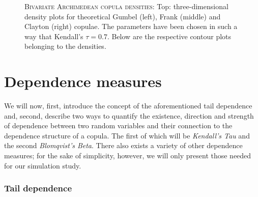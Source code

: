 \begin{figure}[!ht]
{	}
	\hfill
	\hfill
	\caption[\textsc{Bivariate Archimedean copula densities:} A comparison between Gumbel, Frank and Clayton copulae]{\textsc{Bivariate Archimedean copula densities:} Top: three-dimensional density plots for theoretical Gumbel (left), Frank (middle) and Clayton (right) copulae. The parameters have been chosen in such a way that Kendall's $\tau = 0.7$. Below are the respective contour plots belonging to the densities.}
	\label{dens-cont-arch}
\end{figure}


\section{Dependence measures}

We will now, first, introduce the concept of the aforementioned tail dependence and, second, describe two ways to quantify the existence, direction and strength of dependence between two random variables and their connection to the dependence structure of a copula. The first of which will be \textit{Kendall's Tau} and the second \textit{Blomqvist's Beta}. There also exists a variety of other dependence measures; for the sake of simplicity, however, we will only present those needed for our simulation study. 

\subsubsection*{Tail dependence}

